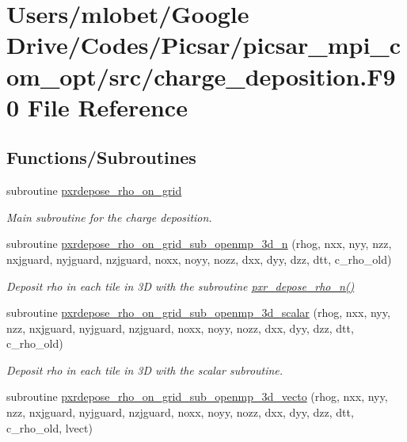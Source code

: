 \hypertarget{charge__deposition_8_f90}{}\section{Users/mlobet/\+Google Drive/\+Codes/\+Picsar/picsar\+\_\+mpi\+\_\+com\+\_\+opt/src/charge\+\_\+deposition.F90 File Reference}
\label{charge__deposition_8_f90}
\subsection*{Functions/\+Subroutines}
\begin{DoxyCompactItemize}
\item 
subroutine \hyperlink{charge__deposition_8_f90_a35ce588d3192033ca711fc1e13ba35b0}{pxrdepose\+\_\+rho\+\_\+on\+\_\+grid}
\begin{DoxyCompactList}\small\item\em Main subroutine for the charge deposition. \end{DoxyCompactList}\item 
subroutine \hyperlink{charge__deposition_8_f90_ad79ab4512aafff415ff9fadc5a16852f}{pxrdepose\+\_\+rho\+\_\+on\+\_\+grid\+\_\+sub\+\_\+openmp\+\_\+3d\+\_\+n} (rhog, nxx, nyy, nzz, nxjguard, nyjguard, nzjguard, noxx, noyy, nozz, dxx, dyy, dzz, dtt, c\+\_\+rho\+\_\+old)
\begin{DoxyCompactList}\small\item\em Deposit rho in each tile in 3D with the subroutine \hyperlink{charge__deposition_8_f90_a1ba91732b5b34c8c04f7570c8df67c26}{pxr\+\_\+depose\+\_\+rho\+\_\+n()} \end{DoxyCompactList}\item 
subroutine \hyperlink{charge__deposition_8_f90_abe02007de55bba499c1fb48bd68842c4}{pxrdepose\+\_\+rho\+\_\+on\+\_\+grid\+\_\+sub\+\_\+openmp\+\_\+3d\+\_\+scalar} (rhog, nxx, nyy, nzz, nxjguard, nyjguard, nzjguard, noxx, noyy, nozz, dxx, dyy, dzz, dtt, c\+\_\+rho\+\_\+old)
\begin{DoxyCompactList}\small\item\em Deposit rho in each tile in 3D with the scalar subroutine. \end{DoxyCompactList}\item 
subroutine \hyperlink{charge__deposition_8_f90_aabcff6131013134563070ad20efbe7a9}{pxrdepose\+\_\+rho\+\_\+on\+\_\+grid\+\_\+sub\+\_\+openmp\+\_\+3d\+\_\+vecto} (rhog, nxx, nyy, nzz, nxjguard, nyjguard, nzjguard, noxx, noyy, nozz, dxx, dyy, dzz, dtt, c\+\_\+rho\+\_\+old, lvect)

\end{DoxyCompactItemize}
